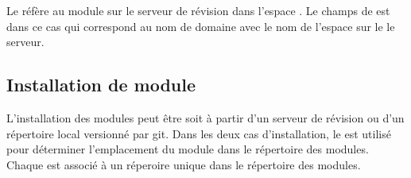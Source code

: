 Le   réfère
au module  sur le serveur de révision 
dans l'espace . Le champs  de est dans ce
cas  qui correspond au nom de domaine avec
le nom de l'espace sur le le serveur.


\subsection{Installation de module}

L'installation des modules peut être soit à partir d'un serveur de révision
ou d'un répertoire local versionné par git. Dans les deux cas d'installation,
le   est utilisé pour déterminer l'emplacement du module
dans le répertoire des modules. Chaque  est associé à un
réperoire unique dans le répertoire des modules.




